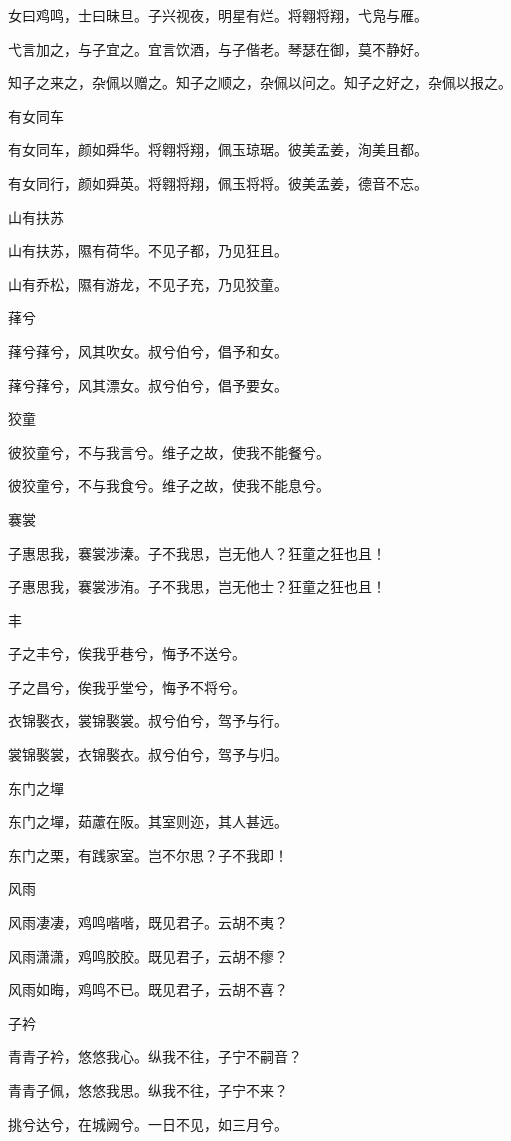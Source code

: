 女曰鸡鸣，士曰昧旦。子兴视夜，明星有烂。将翱将翔，弋凫与雁。

弋言加之，与子宜之。宜言饮酒，与子偕老。琴瑟在御，莫不静好。

知子之来之，杂佩以赠之。知子之顺之，杂佩以问之。知子之好之，杂佩以报之。

有女同车

有女同车，颜如舜华。将翱将翔，佩玉琼琚。彼美孟姜，洵美且都。

有女同行，颜如舜英。将翱将翔，佩玉将将。彼美孟姜，德音不忘。

山有扶苏

山有扶苏，隰有荷华。不见子都，乃见狂且。

山有乔松，隰有游龙，不见子充，乃见狡童。

萚兮

萚兮萚兮，风其吹女。叔兮伯兮，倡予和女。

萚兮萚兮，风其漂女。叔兮伯兮，倡予要女。

狡童

彼狡童兮，不与我言兮。维子之故，使我不能餐兮。

彼狡童兮，不与我食兮。维子之故，使我不能息兮。

褰裳

子惠思我，褰裳涉溱。子不我思，岂无他人？狂童之狂也且！

子惠思我，褰裳涉洧。子不我思，岂无他士？狂童之狂也且！

丰

子之丰兮，俟我乎巷兮，悔予不送兮。

子之昌兮，俟我乎堂兮，悔予不将兮。

衣锦褧衣，裳锦褧裳。叔兮伯兮，驾予与行。

裳锦褧裳，衣锦褧衣。叔兮伯兮，驾予与归。

东门之墠

东门之墠，茹藘在阪。其室则迩，其人甚远。

东门之栗，有践家室。岂不尔思？子不我即！

风雨

风雨凄凄，鸡鸣喈喈，既见君子。云胡不夷？

风雨潇潇，鸡鸣胶胶。既见君子，云胡不瘳？

风雨如晦，鸡鸣不已。既见君子，云胡不喜？

子衿

青青子衿，悠悠我心。纵我不往，子宁不嗣音？

青青子佩，悠悠我思。纵我不往，子宁不来？

挑兮达兮，在城阙兮。一日不见，如三月兮。

